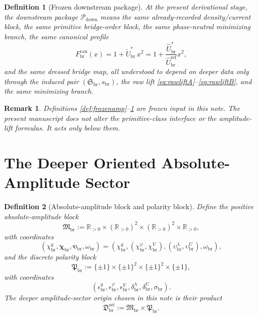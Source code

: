 \documentclass[11pt]{article}
\newcommand{\RespShapeEq}{\widetilde U_{\mathrm{br}}^{\ast}}
\newcommand{\RespRawRef}{\widehat U_{\mathrm{br}}^{\mathrm{ref}}}
\newcommand{\RespRawEq}{\widehat U_{\mathrm{br}}^{\ast}}
\newcommand{\CurvProfileCan}{F_{\mathrm{br}}^{\mathrm{can}}}
\newcommand{\DownPkg}{\mathscr P_{\mathrm{down}}}
\newcommand{\ShapeTuple}{\mathfrak S_{\mathrm{br}}}
\newcommand{\ScaleMod}{s_{\mathrm{br}}}
\newcommand{\AbsAmpSector}{\mathfrak M_{\mathrm{br}}}
\newcommand{\PolaritySector}{\mathfrak P_{\mathrm{br}}}
\newcommand{\OriginSector}{\mathfrak D_{\mathrm{br}}^{\mathrm{ori}}}
\newcommand{\AbsReadAmp}{\chi_{\mathrm{br}}^{q}}
\newcommand{\AbsCovAmp}{\chi_{\mathrm{br}}^{\varphi}}
\newcommand{\AbsRelaxAmp}{\chi_{\mathrm{br}}^{V}}
\newcommand{\AbsKinAmp}{\bm\chi_{\mathrm{br}}}
\newcommand{\AbsWellAmp}{\upsilon_{\mathrm{br}}^{\lambda}}
\newcommand{\AbsEqAmp}{\upsilon_{\mathrm{br}}^{U}}
\newcommand{\AbsAnchorAmp}{\bm\upsilon_{\mathrm{br}}}
\newcommand{\AbsScaleAmp}{\omega_{\mathrm{br}}}
\newcommand{\PolRead}{\epsilon_{\mathrm{br}}^{q}}
\newcommand{\PolCov}{\epsilon_{\mathrm{br}}^{\varphi}}
\newcommand{\PolRelax}{\epsilon_{\mathrm{br}}^{V}}
\newcommand{\PolWell}{\delta_{\mathrm{br}}^{\lambda}}
\newcommand{\PolEq}{\delta_{\mathrm{br}}^{U}}
\newcommand{\PolScale}{\sigma_{\mathrm{br}}}
\newtheorem{definition}{Definition}
\newtheorem{remark}{Remark}
\begin{document}
\begin{definition}[Frozen downstream package]
\label{def:downstream}
At the present derivational stage, the downstream package \(\DownPkg\) means the same already-recorded density/current block, the same primitive bridge-order block, the same phase-neutral minimizing branch, the same canonical profile
\begin{equation}
\CurvProfileCan(x)=1+\RespShapeEq\,x^2
=
1+\frac{\RespRawEq}{\RespRawRef}x^2,
\label{eq:profile}
\end{equation}
and the same dressed bridge map, all understood to depend on deeper data only through the induced pair \((\ShapeTuple,\ScaleMod)\), the raw lift \eqref{eq:rawliftA}--\eqref{eq:rawliftB}, and the same minimizing branch.
\end{definition}

\begin{remark}
Definitions \ref{def:frozenamp}--\ref{def:downstream} are frozen input in this note. The present manuscript does not alter the primitive-class interface or the amplitude-lift formulas. It acts only below them.
\end{remark}

\section{The Deeper Oriented Absolute-Amplitude Sector}

\begin{definition}[Absolute-amplitude block and polarity block]
\label{def:originsector}
Define the positive absolute-amplitude block
\begin{equation}
\AbsAmpSector
:=
\mathbb R_{>0}\times(\mathbb R_{>0})^2\times(\mathbb R_{>0})^2\times\mathbb R_{>0},
\label{eq:abssector}
\end{equation}
with coordinates
\begin{equation}
(\AbsReadAmp,\AbsKinAmp,\AbsAnchorAmp,\AbsScaleAmp)
=
(\AbsReadAmp,(\AbsCovAmp,\AbsRelaxAmp),(\AbsWellAmp,\AbsEqAmp),\AbsScaleAmp),
\label{eq:abscoords}
\end{equation}
and the discrete polarity block
\begin{equation}
\PolaritySector
:=
\{\pm1\}\times\{\pm1\}^2\times\{\pm1\}^2\times\{\pm1\},
\label{eq:polsector}
\end{equation}
with coordinates
\begin{equation}
(\PolRead,\PolCov,\PolRelax,\PolWell,\PolEq,\PolScale).
\label{eq:polcoords}
\end{equation}
The deeper amplitude-sector origin chosen in this note is their product
\begin{equation}
\OriginSector:=\AbsAmpSector\times\PolaritySector.
\label{eq:originsector}
\end{equation}
\end{definition}
\end{document}

